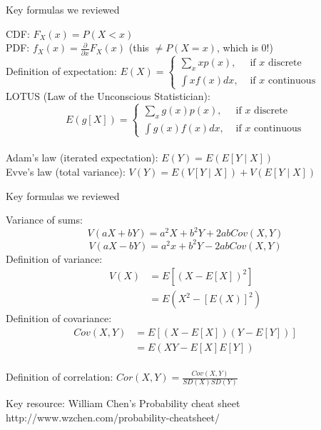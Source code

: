 \documentclass{beamer}
\begin{document}
\begin{frame}{Key formulas we reviewed}
\begin{footnotesize}
CDF: $F_X(x)=P(X<x)$ \\
\medskip
PDF: $f_X(x)=\frac{\partial}{\partial x}F_X(x)$ (this $\neq P(X=x)$, which is 0!) \\
\medskip
Definition of expectation: $E(X)=\begin{cases}\sum_x xp(x),& \text{ if }x\text{ discrete} \\
\int x f(x) dx,&\text{ if }x\text{ continuous}\end{cases}$ \\
\medskip
LOTUS (Law of the Unconscious Statistician):
$$E(g[X])=\begin{cases}\sum_x g(x)p(x),& \text{ if }x\text{ discrete} \\
\int g(x) f(x) dx,&\text{ if }x\text{ continuous}\end{cases}$$ \\
\medskip
Adam's law (iterated expectation): $E(Y)=E(E[Y\mid X])$ \\
\medskip
Evve's law (total variance): $V(Y)=E(V[Y\mid X])+V(E[Y\mid X])$
\end{footnotesize}
\end{frame}

\begin{frame}{Key formulas we reviewed}
\begin{footnotesize}
Variance of sums:
$$V(aX+bY)=a^2X+b^2Y+2abCov(X,Y)$$
$$V(aX-bY)=a^2x+b^2Y-2abCov(X,Y)$$
\medskip
Definition of variance:
\begin{align*}
V(X)&=E\left[\left(X-E[X]\right)^2\right] \\
&=E\left(X^2-\left[E(X)\right]^2\right)
\end{align*}
\medskip
Definition of covariance:
\begin{align*}
Cov(X,Y)&=E\left[\left(X-E[X]\right)\left(Y-E[Y]\right)\right] \\
&=E\left(XY-E[X]E[Y]\right)
\end{align*} \\
\medskip
Definition of correlation: $Cor(X,Y)=\frac{Cov(X,Y)}{SD(X)SD(Y)}$
\end{footnotesize}
\end{frame}

\begin{frame}{Key resource: William Chen's Probability cheat sheet}
http://www.wzchen.com/probability-cheatsheet/
\end{frame}
\end{document}
